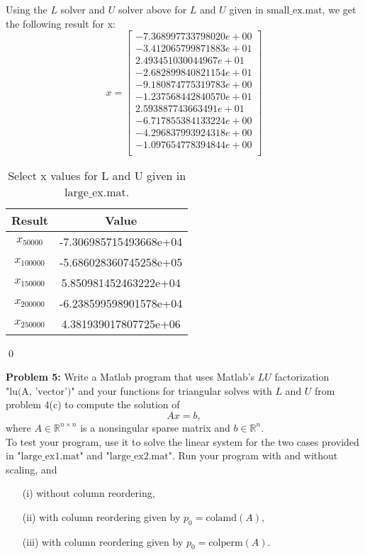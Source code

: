 \documentclass[12pt]{article}
\def\R{\mathbb{R}}
\begin{document}
\begin{itemize}
Using the $L$ solver and $U$ solver above for $L$ and $U$ given in $\text{small\_ex.mat}$, we get the following result for x:\\
$$x = \begin{bmatrix} 
-7.368997733798020e+00\\
    -3.412065799871883e+01\\
     2.493451030044967e+01\\
    -2.682899840821154e+01\\
    -9.180874775319783e+00\\
    -1.237568442840570e+01\\
     2.593887743663491e+01\\
    -6.717855384133224e+00\\
    -4.296837993924318e+00\\
    -1.097654778394844e+00\\

\end{bmatrix}$$


\begin{table}[H]
\centering
\renewcommand{\arraystretch}{1.3}
\begin{tabular}{| c | c |}
\hline
Result &  Value\\
\hline 

$x_{50000}$ &  -7.306985715493668e+04 \\

$x_{100000}$ & -5.686028360745258e+05 \\

$x_{150000}$ & 5.850981452463222e+04 \\

$x_{200000}$ &  -6.238599598901578e+04 \\

$x_{250000}$ & 4.381939017807725e+06 \\

\hline
\end{tabular}
\caption{Select x values for L and U given in $\text{large\_ex.mat}$.}
\end{table} 
\qed
\end{itemize}
\newpage
\bigskip\bigskip
\noindent
\textbf{Problem 5:} Write a Matlab program that uses Matlab's $LU$ factorization $\text{"lu(A, 'vector')"}$ and your functions for triangular solves with $L$ and $U$ from problem 4(c) to compute the solution of 
$$Ax = b,$$
where $A \in\R^{n\times n}$ is a nonsingular sparse matrix and $b \in\R^n$.\\
To test your program, use it to solve the linear system for the two cases provided in $\text{"large\_ex1.mat"}$ and $\text{"large\_ex2.mat"}$.  Run your program with and without scaling, and
\begin{itemize}
\item[(i)] without column reordering,
\item[(ii)] with column reordering given by $p_0 = \text{colamd}(A)$,
\item[(iii)] with column reordering given by $p_0 = \text{colperm}(A)$.
\end{itemize}
\end{document}
